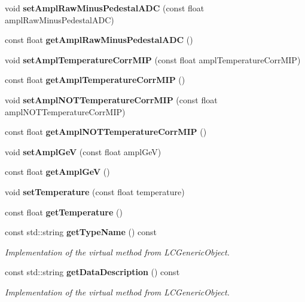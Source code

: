 \begin{DoxyCompactItemize}
\item 
void {\bfseries set\-Ampl\-Raw\-Minus\-Pedestal\-A\-D\-C} (const float ampl\-Raw\-Minus\-Pedestal\-A\-D\-C)\label{classCALICE_1_1AhcAmplitude_af248705124029b6a523b1c79b189b0bd}

\item 
const float {\bfseries get\-Ampl\-Raw\-Minus\-Pedestal\-A\-D\-C} ()\label{classCALICE_1_1AhcAmplitude_ad514eaba7b4412210f37a950b4abfe97}

\item 
void {\bfseries set\-Ampl\-Temperature\-Corr\-M\-I\-P} (const float ampl\-Temperature\-Corr\-M\-I\-P)\label{classCALICE_1_1AhcAmplitude_a0d3fd86e8d35dbbc05b3cca3f3421e75}

\item 
const float {\bfseries get\-Ampl\-Temperature\-Corr\-M\-I\-P} ()\label{classCALICE_1_1AhcAmplitude_a0b607cb3be3e999a5ac7b38dc459dd3a}

\item 
void {\bfseries set\-Ampl\-N\-O\-T\-Temperature\-Corr\-M\-I\-P} (const float ampl\-N\-O\-T\-Temperature\-Corr\-M\-I\-P)\label{classCALICE_1_1AhcAmplitude_aa26157732c7138aaee6ad7f194a3bca6}

\item 
const float {\bfseries get\-Ampl\-N\-O\-T\-Temperature\-Corr\-M\-I\-P} ()\label{classCALICE_1_1AhcAmplitude_a755d45a5e563ce40e17d312d444d99ab}

\item 
void {\bfseries set\-Ampl\-Ge\-V} (const float ampl\-Ge\-V)\label{classCALICE_1_1AhcAmplitude_a445c83887997f254e988e914eed7b670}

\item 
const float {\bfseries get\-Ampl\-Ge\-V} ()\label{classCALICE_1_1AhcAmplitude_a4289af7ccb604b8a2db0e8202efe6374}

\item 
void {\bfseries set\-Temperature} (const float temperature)\label{classCALICE_1_1AhcAmplitude_ab2872aa24017885f071a7e66181c5913}

\item 
const float {\bfseries get\-Temperature} ()\label{classCALICE_1_1AhcAmplitude_a8e820e9eb754d24fa5e6d87e2f30c00b}

\item 
const std\-::string {\bf get\-Type\-Name} () const 
\begin{DoxyCompactList}\small\item\em Implementation of the virtual method from L\-C\-Generic\-Object. \end{DoxyCompactList}\item 
const std\-::string {\bf get\-Data\-Description} () const 
\begin{DoxyCompactList}\small\item\em Implementation of the virtual method from L\-C\-Generic\-Object. \end{DoxyCompactList}\end{DoxyCompactItemize}
